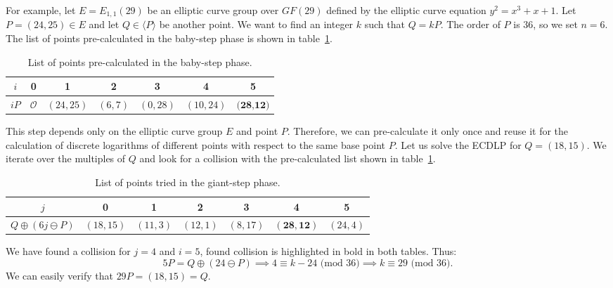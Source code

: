 \documentclass[thesis=M,english]{FITthesis}[2012/10/20]
\theoremstyle{remark}
\theoremstyle{definition}
\begin{document}
\noindent For example, let $E = E_{1,1}(29)$ be an elliptic curve group over $GF(29)$ defined by the elliptic curve equation $y^2 = x^3 + x + 1$. Let $P = (24,25) \in E$ and let $Q \in \langle P \rangle$ be another point. We want to find an integer $k$ such that $Q = kP.$ The order of $P$ is 36, so we set $n = 6$. The list of points pre-calculated in the baby-step phase is shown in table~\ref{baby}.
\begin{table}[h]
\centering
\begin{tabular}{ |c||c|c|c|c|c|c| }
\hline
$i$ & 0 & 1 & 2 & 3 & 4 & 5\\ \hline
 $iP$ & $\mathcal{O}$ & $(24,25)$ &  $(6,7)$ & $(0,28)$ & $(10,24)$ & $\textbf{(28,12)}$ \\ \hline
\end{tabular}
\caption[List of points pre-calculated in the baby-step phase]{List of points pre-calculated in the baby-step phase.}
\label{baby}
\end{table}
This step depends only on the elliptic curve group $E$ and point $P$. Therefore, we can pre-calculate it only once and reuse it for the calculation of discrete logarithms of different points with respect to the same base point $P$. Let us solve the ECDLP for $Q = (18,15)$. We iterate over the multiples of $Q$ and look for a collision with the pre-calculated list shown in table~\ref{baby}.
\begin{table}[h]
\centering
\begin{tabular}{ |c||c|c|c|c|c|c| }
\hline
$j$ & 0 & 1 & 2 & 3 & 4 & 5\\ \hline
 $Q\oplus(6j\ominus P)$ & $(18,15)$ & $(11,3)$ &  $(12,1)$ & $(8,17)$ & $\mathbf{(28,12)}$ & $(24,4)$ \\ \hline
\end{tabular}
\caption[List of points tried in the giant-step phase]{List of points tried in the giant-step phase.}
\end{table}
\noindent We have found a collision for $j=4$ and $i=5$, found collision is highlighted in bold in both tables. Thus:
$$
5P = Q\oplus(24\ominus P) \implies 4 \equiv k -24 \text{ (mod 36)} \implies k \equiv 29  \text{ (mod 36)}.
$$
We can easily verify that $29P = (18,15) = Q.$
\end{document}
